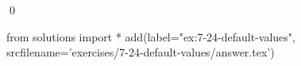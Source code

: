 
\begin{ex}
  \label{ex:7-24-default-values}
  
  \qed
\end{ex}
\begin{python0}
from solutions import *
add(label="ex:7-24-default-values",
    srcfilename='exercises/7-24-default-values/answer.tex')
\end{python0}
